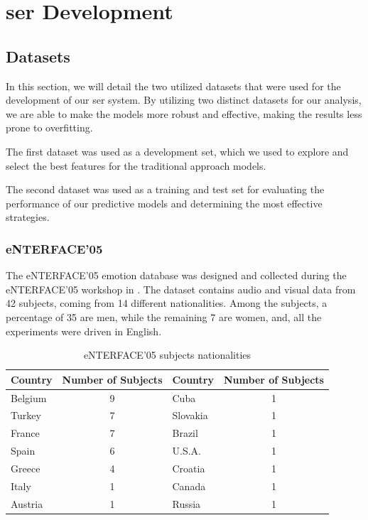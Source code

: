\chapter{\ac{ser} Development}
\label{chapter:strat}

\section{Datasets}

In this section, we will detail the two utilized datasets that were used for the development of our \ac{ser} system.
By utilizing two distinct datasets for our analysis, we are able to make the models more robust and effective, making the results less prone to overfitting.

The first dataset was used as a development set, which we used to explore and select the best features for the traditional approach models.

The second dataset was used as a training and test set for evaluating the performance of our predictive models and determining the most effective strategies.

\subsection{eNTERFACE'05}

The eNTERFACE’05 emotion database \cite{Martin2006} was designed and collected during the eNTERFACE’05 workshop in \citeyear{Martin2006}. The dataset contains audio and visual data from 42 subjects, coming from 14 different nationalities. Among the subjects, a percentage of 35 are men, while the remaining 7 are women, and, all the experiments were driven in English.

\begin{table}[H]
	\centering
	\caption{eNTERFACE'05 subjects nationalities}
	\label{tab:enterfaceDiversity}
	\begin{tabular}{lc|lc}
		\toprule
		Country &Number of Subjects &Country &Number of Subjects\\
		\midrule
		Belgium & 9 & Cuba     & 1\\
		Turkey  & 7 & Slovakia & 1\\
		France  & 7 & Brazil   & 1\\
		Spain   & 6 & U.S.A.   & 1\\
		Greece  & 4 & Croatia  & 1\\
		Italy   & 1 & Canada   & 1\\
		Austria & 1 & Russia   & 1\\
		\bottomrule
	\end{tabular}
\end{table}


